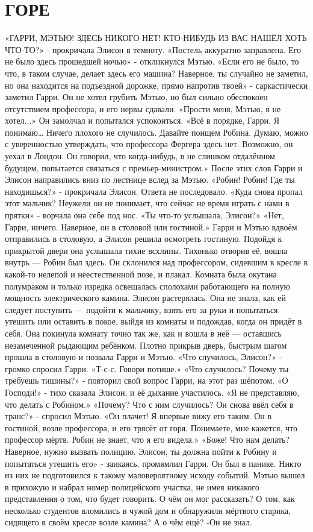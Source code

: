 \documentclass[a4paper,12pt]{book}
\begin{document}
\chapter{ГОРЕ}
	«ГАРРИ, МЭТЬЮ! ЗДЕСЬ НИКОГО НЕТ!  КТО-НИБУДЬ ИЗ ВАС НАШЁЛ ХОТЬ ЧТО-ТО?» - прокричала Элисон в темноту.
	«Постель аккуратно заправлена. Его не было здесь прошедшей ночью» - откликнулся Мэтью.
	«Если его не было, то что, в таком случае, делает здесь его машина? Наверное, ты случайно не заметил, но она находится на подъездной дорожке, прямо напротив твоей» - саркастически заметил Гарри. Он не хотел грубить Мэтью, но был сильно обеспокоен отсутствием профессора, и его нервы сдавали.
	«Прости меня, Мэтью, я не хотел...»
	Он замолчал и попытался успокоиться.
	«Всё в порядке, Гарри. Я понимаю… Ничего плохого не случилось. Давайте поищем Робина. Думаю, можно с уверенностью утверждать, что профессора Фергера здесь нет. Возможно, он уехал в Лондон. Он говорил, что когда-нибудь, в не слишком отдалённом будущем, попытается связаться с премьер-министром.»
	После этих слов Гарри и Элисон направились вниз по лестнице вслед за Мэтью.
	«Робин! Робин! Где ты находишься?» - прокричала Элисон.
	Ответа не последовало.
	«Куда снова пропал этот мальчик? Неужели он не понимает, что сейчас не время играть с нами в прятки» - ворчала она себе под нос.
	«Ты что-то услышала, Элисон?»
	«Нет, Гарри, ничего. Наверное, он в столовой или гостиной.»
	Гарри и Мэтью вдвоём отправились в столовую, а Элисон решила осмотреть гостиную.
	Подойдя к прикрытой двери она услышала тихие всхлипы. Тихонько отворив её, вошла внутрь — Робин был здесь. Он склонился над профессором, сидевшим в кресле в какой-то нелепой и неестественной позе, и плакал. Комната была окутана полумраком и только изредка освещалась сполохами работающего на полную мощность электрического камина.
	Элисон растерялась. Она не знала, как ей следует поступить — подойти к мальчику, взять его за руки и попытаться утешить или оставить в покое, выйдя из комнаты и подождав, когда он придёт в себя.
	Она покинула комнату точно так же, как и вошла в неё —  оставшись незамеченной рыдающим ребёнком. Плотно прикрыв дверь, быстрым шагом прошла в столовую и позвала Гарри и Мэтью.
	«Что случилось, Элисон?» - громко спросил Гарри.
	«Т-с-с. Говори потише.»
	«Что случилось? Почему ты требуешь тишины?» - повторил свой вопрос Гарри, на этот раз шёпотом.
	«О Господи!» - тихо сказала Элисон, и её дыхание участилось.
	«Я не представляю, что делать с Робином.»
	«Почему? Что с ним случилось? Он снова ввёл себя в транс?» - спросил Мэтью.
	«Он плачет! Я впервые вижу его таким. Он в гостиной, возле профессора, и его трясёт от горя. Понимаете, мне кажется, что профессор мёртв. Робин не знает, что я его видела.»
	«Боже! Что нам делать? Наверное, нужно вызвать полицию. Элисон, ты должна пойти к Робину и попытаться утешить его» - заикаясь, промямлил Гарри. Он был в панике. Никто из них не подготовился к такому маловероятному исходу событий.
	Мэтью вышел в прихожую и набрал номер полицейского участка, не имея никакого представления о том, что будет говорить. О чём он мог рассказать? О том, как несколько студентов вломились в чужой дом и обнаружили мёртвого старика, сидящего в своём кресле возле камина? А о чём ещё? -Он не знал.
\end{document}
